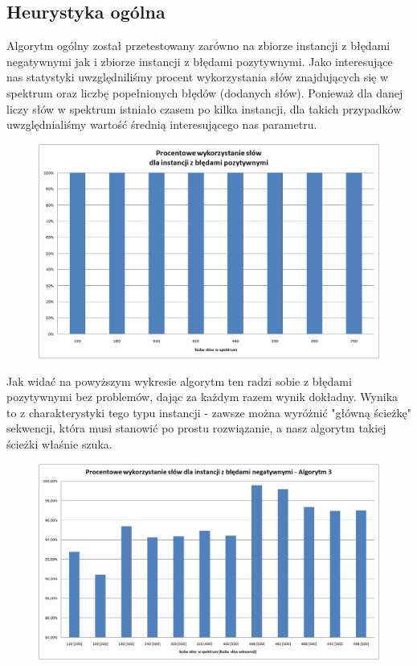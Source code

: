 \documentclass[a4paper,10pt]{article}
\begin{document}
\subsection{Heurystyka ogólna}

Algorytm ogólny został przetestowany zarówno na zbiorze instancji z błędami negatywnymi jak i zbiorze instancji z błędami pozytywnymi. 
Jako interesujące nas statystyki uwzględniliśmy procent wykorzystania słów znajdujących się w spektrum oraz liczbę popełnionych błędów 
(dodanych słów). Ponieważ dla danej liczy słów w spektrum istniało czasem po kilka instancji, dla takich przypadków uwzględnialiśmy wartość średnią interesującego nas parametru.

\begin{figure}[h]
  \footnotesize\centering
  \includegraphics[width=\textwidth,keepaspectratio]{percentageUsedWords_general_positive.png}
\end{figure}

Jak widać na powyższym wykresie algorytm ten radzi sobie z błędami pozytywnymi bez problemów, dając za każdym razem wynik dokładny. 
Wynika to z charakterystyki tego typu instancji - zawsze można wyróżnić "główną ścieżkę" sekwencji, która musi stanowić po prostu rozwiązanie, a nasz algorytm takiej ścieżki właśnie szuka.

\begin{figure}[h]
  \footnotesize\centering
  \includegraphics[width=\textwidth,keepaspectratio]{percentageUsedWords_general_negative.png}
\end{figure}
\end{document}
